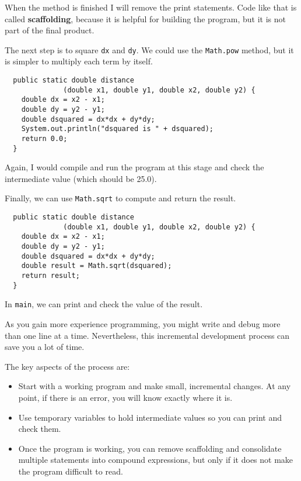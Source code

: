 \documentclass{book}
\begin{document}

When the method is finished I will remove the print statements.  Code
like that is called {\bf scaffolding}, because it is helpful for
building the program, but it is not part of the final product.

The next step is to square {\tt dx} and {\tt dy}.  We could use the
{\tt Math.pow} method, but it is simpler to multiply each term by
itself.

\begin{verbatim}
  public static double distance
              (double x1, double y1, double x2, double y2) {
    double dx = x2 - x1;
    double dy = y2 - y1;
    double dsquared = dx*dx + dy*dy;
    System.out.println("dsquared is " + dsquared);
    return 0.0;
  }
\end{verbatim}
%
Again, I would compile and run the program at this stage
and check the intermediate value (which should be 25.0).

Finally, we can use {\tt Math.sqrt} to compute and
return the result.

\begin{verbatim}
  public static double distance
              (double x1, double y1, double x2, double y2) {
    double dx = x2 - x1;
    double dy = y2 - y1;
    double dsquared = dx*dx + dy*dy;
    double result = Math.sqrt(dsquared);
    return result;
  }
\end{verbatim}
%
In {\tt main}, we can print and check the value of the result.

As you gain more experience programming, you might
write and debug more than one line at a time.  Nevertheless,
this incremental development process can save you a lot of
time.

The key aspects of the process are:

\begin{itemize}

\item Start with a working program and make small, incremental
changes.  At any point, if there is an error, you will know
exactly where it is.

\item Use temporary variables to hold intermediate values so
you can print and check them.

\item Once the program is working, you can remove
scaffolding and consolidate multiple statements into
compound expressions, but only if it does not make the program
difficult to read.

\end{itemize}
\end{document}
